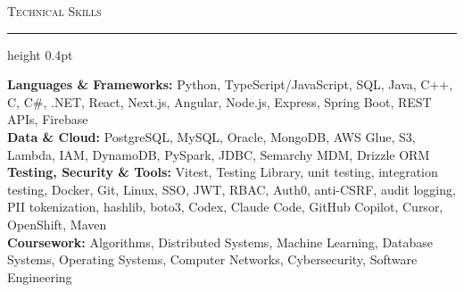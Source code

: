 \documentclass[letterpaper,11pt]{article}
\newcommand{\resumesection}[1]{%
  \par\vspace{2pt}%
  {\large\scshape #1}\par\vspace{2pt}%
  \hrule height 0.4pt\vspace{2pt}%
}
\begin{document}
\resumesection{Technical Skills}
\textbf{Languages \& Frameworks:} Python, TypeScript/JavaScript, SQL, Java, C++, C, C\#, .NET, React, Next.js, Angular, Node.js, Express, Spring Boot, REST APIs, Firebase\\
\textbf{Data \& Cloud:} PostgreSQL, MySQL, Oracle, MongoDB, AWS Glue, S3, Lambda, IAM, DynamoDB, PySpark, JDBC, Semarchy MDM, Drizzle ORM\\
\textbf{Testing, Security \& Tools:} Vitest, Testing Library, unit testing, integration testing, Docker, Git, Linux, SSO, JWT, RBAC, Auth0, anti-CSRF, audit logging, PII tokenization, hashlib, boto3, Codex, Claude Code, GitHub Copilot, Cursor, OpenShift, Maven\\
\textbf{Coursework:} Algorithms, Distributed Systems, Machine Learning, Database Systems, Operating Systems, Computer Networks, Cybersecurity, Software Engineering
\end{document}
